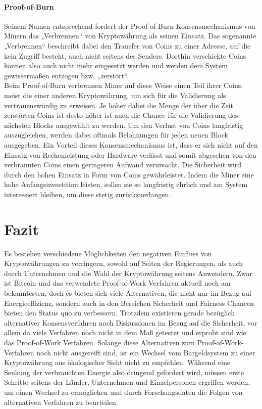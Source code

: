 \documentclass[12pt]{article}
\begin{document}
\subsection{Proof-of-Burn}
Seinem Namen entsprechend fordert der Proof-of-Burn Konsensmechanismus von Minern das „Verbrennen“ von Kryptowährung als seinen Einsatz. Das sogenannte „Verbrennen“ beschreibt dabei den Transfer von Coins zu einer Adresse, auf die kein Zugriff besteht, auch nicht seitens des Senders. Dorthin verschickte Coins können also auch nicht mehr eingesetzt werden und werden dem System gewissermaßen entzogen bzw. „zerstört“.\\
Beim Proof-of-Burn verbrennen Miner auf diese Weise einen Teil ihrer Coins, meist die einer anderen Kryptowährung, um sich für die Validierung als vertrauenswürdig zu erweisen. Je höher dabei die Menge der über die Zeit zerstörten Coins ist desto höher ist auch die Chance für die Validierung des nächsten Blocks ausgewählt zu werden. Um den Verlust von Coins langfristig auszugleichen, werden dabei oftmals Belohnungen für jeden neuen Block ausgegeben.
Ein Vorteil dieses Konsensmechanismus ist, dass er sich nicht auf den Einsatz von Rechenleistung oder Hardware verlässt und somit abgesehen von den verbrannten Coins einen geringeren Aufwand verursacht. Die Sicherheit wird durch den hohen Einsatz in Form von Coins gewährleistet. Indem die Miner eine hohe Anfangsinvestition leisten, sollen sie so langfristig ehrlich und am System interessiert bleiben, um diese stetig zurückzuerlangen.

\part{Fazit}
Es bestehen verschiedene Möglichkeiten den negativen Einfluss von Kryptowährungen zu verringern, sowohl auf Seiten der Regierungen, als auch durch Unternehmen und die Wahl der Kryptowährung seitens Anwendern. Zwar ist Bitcoin und das verwendete Proof-of-Work Verfahren aktuell noch am bekanntesten, doch es bieten sich viele Alternativen, die nicht nur im Bezug auf Energieeffizienz, sondern auch in den Bereichen Sicherheit und Fairness Chancen bieten den Status quo zu verbessern. Trotzdem existieren gerade bezüglich alternativer Konsensverfahren noch Diskussionen im Bezug auf die Sicherheit, vor allem da viele Verfahren noch nicht in dem Maß getestet und erprobt sind wie das Proof-of-Work Verfahren. Solange diese Alternativen zum Proof-of-Work-Verfahren noch nicht ausgereift sind, ist ein Wechsel vom Bargeldsystem zu einer Kryptowährung aus ökologischer Sicht nicht zu empfehlen. Während eine Senkung der verbrauchten Energie also dringend gefordert wird, müssen erste Schritte seitens der Länder, Unternehmen und Einzelpersonen ergriffen werden, um einen Wechsel zu ermöglichen und durch Forschungsdaten die Folgen von alternativen Verfahren zu beurteilen.
\end{document}
